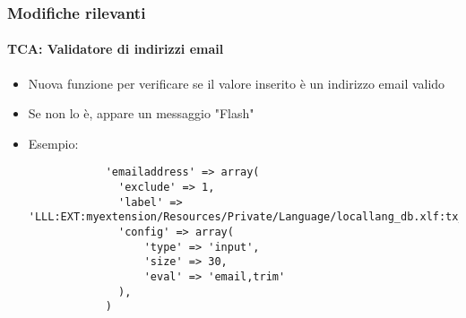 \begin{frame}[fragile]
	\frametitle{Modifiche rilevanti}
	\framesubtitle{TCA: Validatore di indirizzi email}

	\lstset{
		basicstyle=\tiny\ttfamily
	}

	\begin{itemize}

		\item Nuova funzione per verificare se il valore inserito è un indirizzo email valido
		\item Se non lo è, appare un messaggio "Flash"
		\item Esempio:

		\begin{lstlisting}
			'emailaddress' => array(
			  'exclude' => 1,
			  'label' => 'LLL:EXT:myextension/Resources/Private/Language/locallang_db.xlf:tx_myextension
		 	  'config' => array(
			      'type' => 'input',
			      'size' => 30,
			      'eval' => 'email,trim'
			  ),
			)
		\end{lstlisting}

	\end{itemize}

\end{frame}


